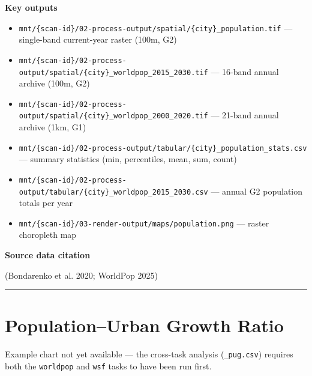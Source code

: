 \documentclass[
  letterpaper,
  DIV=11,
  numbers=noendperiod]{scrreprt}
\providecommand{\tightlist}{%
  \setlength{\itemsep}{0pt}\setlength{\parskip}{0pt}}
\begin{document}
\textbf{Key outputs}

\begin{itemize}
\tightlist
\item
  \texttt{mnt/\{scan-id\}/02-process-output/spatial/\{city\}\_population.tif}
  --- single-band current-year raster (100m, G2)
\item
  \texttt{mnt/\{scan-id\}/02-process-output/spatial/\{city\}\_worldpop\_2015\_2030.tif}
  --- 16-band annual archive (100m, G2)
\item
  \texttt{mnt/\{scan-id\}/02-process-output/spatial/\{city\}\_worldpop\_2000\_2020.tif}
  --- 21-band annual archive (1km, G1)
\item
  \texttt{mnt/\{scan-id\}/02-process-output/tabular/\{city\}\_population\_stats.csv}
  --- summary statistics (min, percentiles, mean, sum, count)
\item
  \texttt{mnt/\{scan-id\}/02-process-output/tabular/\{city\}\_worldpop\_2015\_2030.csv}
  --- annual G2 population totals per year
\item
  \texttt{mnt/\{scan-id\}/03-render-output/maps/population.png} ---
  raster choropleth map
\end{itemize}

\textbf{Source data citation}

(Bondarenko et al. 2020; WorldPop 2025)

\begin{center}\rule{0.5\linewidth}{0.5pt}\end{center}

\section{Population--Urban Growth
Ratio}\label{populationurban-growth-ratio}

\begin{tcolorbox}[enhanced jigsaw, arc=.35mm, bottomrule=.15mm, breakable, colback=white, colframe=quarto-callout-note-color-frame, left=2mm, leftrule=.75mm, opacityback=0, rightrule=.15mm, toprule=.15mm]
\begin{minipage}[t]{5.5mm}
\textcolor{quarto-callout-note-color}{\faInfo}
\end{minipage}%
\begin{minipage}[t]{\textwidth - 5.5mm}

Example chart not yet available --- the cross-task analysis
(\texttt{\_pug.csv}) requires both the \texttt{worldpop} and
\texttt{wsf} tasks to have been run first.

\end{minipage}%
\end{tcolorbox}
\end{document}
